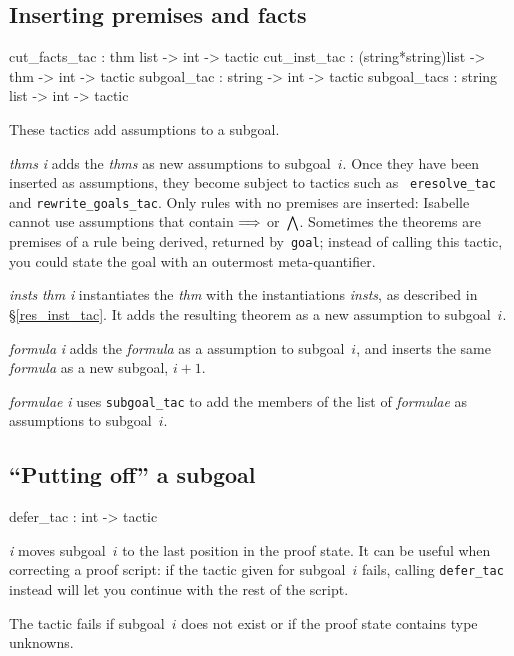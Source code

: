 \subsection{Inserting premises and facts}\label{cut_facts_tac}
\begin{ttbox} 
cut_facts_tac : thm list -> int -> tactic
cut_inst_tac  : (string*string)list -> thm -> int -> tactic
subgoal_tac   : string -> int -> tactic
subgoal_tacs  : string list -> int -> tactic
\end{ttbox}
These tactics add assumptions to a subgoal.
\begin{ttdescription}
\item[\ttindexbold{cut_facts_tac} {\it thms} {\it i}] 
  adds the {\it thms} as new assumptions to subgoal~$i$.  Once they have
  been inserted as assumptions, they become subject to tactics such as {\tt
    eresolve_tac} and {\tt rewrite_goals_tac}.  Only rules with no premises
  are inserted: Isabelle cannot use assumptions that contain $\Longrightarrow$
  or~$\bigwedge$.  Sometimes the theorems are premises of a rule being
  derived, returned by~{\tt goal}; instead of calling this tactic, you
  could state the goal with an outermost meta-quantifier.

\item[\ttindexbold{cut_inst_tac} {\it insts} {\it thm} {\it i}]
  instantiates the {\it thm} with the instantiations {\it insts}, as
  described in \S\ref{res_inst_tac}.  It adds the resulting theorem as a
  new assumption to subgoal~$i$. 

\item[\ttindexbold{subgoal_tac} {\it formula} {\it i}] 
adds the {\it formula} as a assumption to subgoal~$i$, and inserts the same
{\it formula} as a new subgoal, $i+1$.

\item[\ttindexbold{subgoals_tac} {\it formulae} {\it i}] 
  uses {\tt subgoal_tac} to add the members of the list of {\it
    formulae} as assumptions to subgoal~$i$. 
\end{ttdescription}


\subsection{``Putting off'' a subgoal}
\begin{ttbox} 
defer_tac : int -> tactic
\end{ttbox}
\begin{ttdescription}
\item[\ttindexbold{defer_tac} {\it i}] 
  moves subgoal~$i$ to the last position in the proof state.  It can be
  useful when correcting a proof script: if the tactic given for subgoal~$i$
  fails, calling {\tt defer_tac} instead will let you continue with the rest
  of the script.

  The tactic fails if subgoal~$i$ does not exist or if the proof state
  contains type unknowns. 
\end{ttdescription}


